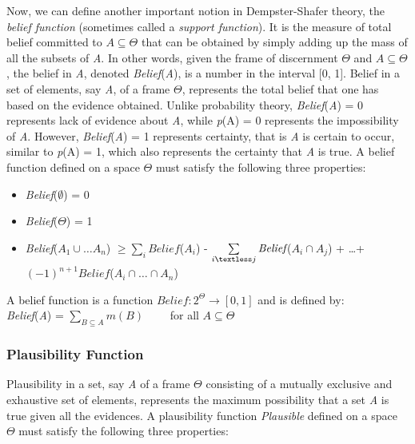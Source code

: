 \documentclass[11pt]{article}
\begin{document}
Now, we can define another important notion in Dempster-Shafer theory, the
\textit{belief function} (sometimes called a \textit{support function}). It is
the measure of total belief committed to $A \subseteq \Theta$ that can be
obtained by simply adding up the mass of all the subsets of \textit{A}. In other
words, given the frame of discernment $\Theta$ and $A \subseteq \Theta$, the
belief in \textit{A}, denoted \textit{Belief}(\textit{A}), is a number in the
interval [0, 1]. Belief in a set of elements, say \textit{A}, of a frame
$\Theta$, represents the total belief that one has based on the evidence
obtained. Unlike probability theory, \textit{Belief}(\textit{A}) = 0 represents
lack of evidence about \textit{A}, while \textit{p}(A) = 0 represents the
impossibility of \textit{A}. However, \textit{Belief}(\textit{A}) = 1 represents
certainty, that is \textit{A} is certain to occur, similar to \textit{p}(A) = 1,
which also represents the certainty that \textit{A} is true. A belief function
defined on a space $\Theta$ must satisfy the following three properties:

\begin{itemize}
	\item[]\textit{Belief}($\emptyset$) = 0
	\item[]\textit{Belief}($\Theta$) = 1
	\item[]\small\textit{Belief}($A_1 \cup \ldots A_n$)
	$\geq \sum\limits_i\textit{Belief}$($A_i$) - $\sum\limits_{i \textless
	j}\textit{Belief}$($A_i \cap A_j$) + \ldots +\\
	$(-1)^{n+1}\textit{Belief}$($A_i \cap \ldots \cap A_n$)
\end{itemize}

\noindent A belief function is a function $Belief:2^\Theta\rightarrow[0,1]$ and
is defined by:\\

\textit{Belief}(\textit{A}) = $\sum\limits_{B \subseteq A}m(B)\qquad$ for all $A
\subseteq \Theta$\\

\subsubsection{Plausibility Function}

Plausibility in a set, say \textit{A} of a frame $\Theta$ consisting of a
mutually exclusive and exhaustive set of elements, represents the maximum
possibility that a set \textit{A} is true given all the evidences. A
plausibility function \textit{Plausible} defined on a space $\Theta$ must satisfy the
following three properties:
\end{document}
